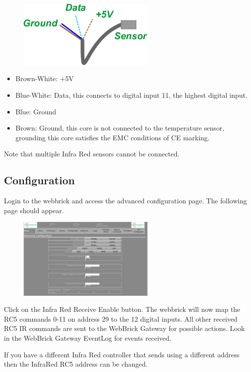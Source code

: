 \begin{figure}[H]
\centering
\includegraphics[width=0.6\textwidth]{Images/InfraRedSensorWiring.png}
\end{figure}

	\begin{itemize}
	  
	  \item{Brown-White:} +5V
	  		
	  \item{Blue-White:} Data, this connects to digital input 11, the highest digital input.

	  \item{Blue:} Ground 

	  \item{Brown:} Ground, this core is not connected to the temperature sensor,
	  		grounding this core satisfies the EMC conditions of CE marking.
	  			
	\end{itemize}

Note that multiple Infra Red sensors cannot be connected.

\subsection{Configuration}

Login to the webbrick and access the advanced configuration page. The following page should appear.

\begin{figure}[H]
\centering
\includegraphics[width=0.6\textwidth]{Images/Advanced.png}
\end{figure}

Click on the Infra Red Receive Enable button. The webbrick will now map the RC5 commands 0-11 on address 29 to the 12 digital inputs. All other 
received RC5 IR commands are sent to the WebBrick Gateway for possible actions. Look in the WebBrick Gateway EventLog for events received.

If you have a different Infra Red controller that sends using a different address then the InfraRed RC5 address can be changed.

